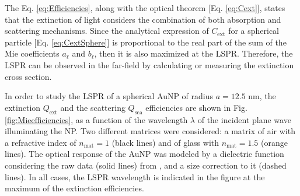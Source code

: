 The Eq. \eqref{eq:Efficiencies}, along with the optical theorem [Eq. \eqref{eq:Cext}], states that the extinction of light considers  the combination of both absorption and scattering mechanisms. Since the analytical expression of $C_\text{ext}$ for a spherical particle [Eq. \eqref{eq:CextSphere}] is proportional to the real part of the sum of the Mie coefficients $a_\ell$ and $b_\ell$, then it is also maximized at the LSPR. Therefore, the LSPR can be observed in the far-field by calculating or measuring the extinction cross section.

In order to study the LSPR of a spherical AuNP of radius $a = 12.5$ nm, the extinction  $Q_\text{ext}$ and the scattering  $Q_\text{sca}$ efficiencies are shown in Fig. \ref{fig:Mieefficiencies}, as a function of the wavelength $\lambda$ of the incident plane wave illuminating the NP. Two different matrices were considered: a matrix of air with a refractive index of $n_\text{mat} = 1$ (black lines) and of glass with $n_\text{mat} = 1.5$ (orange lines). The optical response of the AuNP was modeled by a dielectric function considering the raw data (solid lines) from \citeauthor{johnson_optical_1972} \cite{johnson_optical_1972}, and a size correction to it (dashed lines). In all cases, the LSPR wavelength is indicated in the figure at the maximum of the extinction efficiencies.

